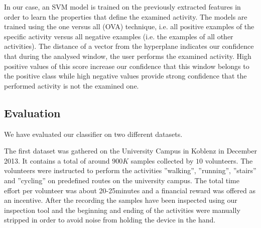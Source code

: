 In our case, an SVM model is trained on the previously extracted
features in order to learn the properties that define the examined
activity. The models are trained using the one versus all (OVA)
technique, i.e. all positive examples of the specific activity versus
all negative examples (i.e. the examples of all other activities). The
distance of a vector from the hyperplane indicates our confidence that
during the analysed window, the user performs the examined
activity. High positive values of this score increase our confidence
that this window belongs to the positive class while high negative
values provide strong confidence that the performed activity is not
the examined one.




\subsection{Evaluation}\label{sec:har_eval}

We have evaluated our classifier on two different datasets.

The first dataset was gathered on the University Campus in Koblenz in
December 2013.  It contains a total of around $900K$ samples collected
by $10$ volunteers.  The volunteers were instructed to perform the
activities ''walking'', ''running'', ''stairs'' and ''cycling'' on
predefined routes on the university campus. 
The total time effort per volunteer was about 20-25minutes and a financial reward was offered as
an incentive. After the recording the samples have been inspected
using our inspection tool and the beginning and ending of the
activities were manually stripped in order to avoid noise from holding
the device in the hand.


